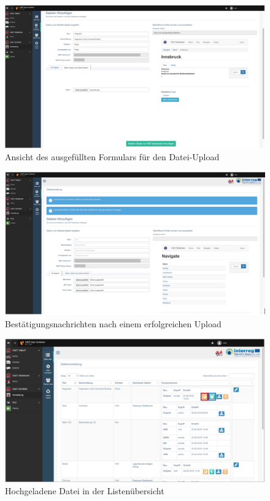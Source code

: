 \begin{figure}[ht!]
\centering
\includegraphics[width=12cm]{Figures/paula/dateiverwaltung/datei_hochladen_ausgefuellt.png}
\caption{Ansicht des ausgefüllten Formulars für den Datei-Upload}
\label{img:datei_hochladen_ausgefuellt}
\end{figure}

\begin{figure}[ht!]
\centering
\includegraphics[width=12cm]{Figures/paula/dateiverwaltung/bestaetigung_nach_hochladen.png}
\caption{Bestätigungsnachrichten nach einem erfolgreichen Upload}
\label{img:bestaetigung_nach_hochladen}
\end{figure}

\begin{figure}[ht!]
\centering
\includegraphics[width=12cm]{Figures/paula/dateiverwaltung/datei_in_listenuebersicht.png}
\caption{Hochgeladene Datei in der Listenübersicht}
\label{img:datei_in_listenuebersichtn}
\end{figure}

